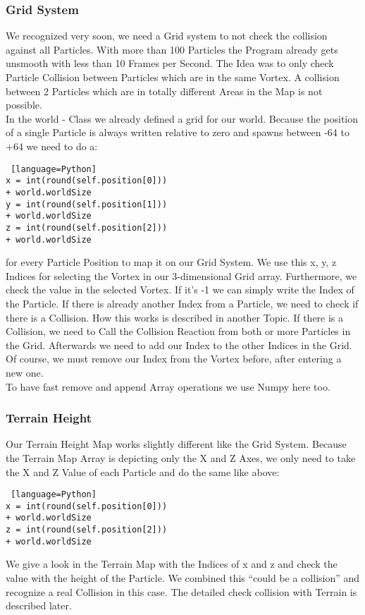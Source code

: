 \documentclass{sig-alternate-05-2015}
\begin{document}
\subsubsection{Grid System}
We recognized very soon, we need a Grid system to not check the collision against all Particles. With more than 100 Particles the Program already gets unsmooth with less than 10 Frames per Second. The Idea was to only check Particle Collision between Particles which are in the same Vortex. A collision between 2 Particles which are in totally different Areas in the Map is not possible.\\
In the world - Class we already defined a grid for our world. Because the position of a single Particle is always written relative to zero and spawns between -64 to +64 we need to do a: \\
\begin{lstlisting} [language=Python]
x = int(round(self.position[0])) 
+ world.worldSize
y = int(round(self.position[1]))
+ world.worldSize
z = int(round(self.position[2]))
+ world.worldSize
\end{lstlisting}
for every Particle Position to map it on our Grid System. We use this x, y, z Indices for selecting the Vortex in our 3-dimensional Grid array. Furthermore, we check the value in the selected Vortex. If it’s -1 we can simply write the Index of the Particle. If there is already another Index from a Particle, we need to check if there is a Collision. How this works is described in another Topic. If there is a Collision, we need to Call the Collision Reaction from both or more Particles in the Grid. Afterwards we need to add our Index to the other Indices in the Grid. Of course, we must remove our Index from the Vortex before, after entering a new one. \\
To have fast remove and append Array operations we use Numpy here too. \\
\subsubsection{Terrain Height}
Our Terrain Height Map works slightly different like the Grid System. Because the Terrain Map Array is depicting only the X and Z Axes, we only need to take the X and Z Value of each Particle and do the same like above: \\
\begin{lstlisting} [language=Python]
x = int(round(self.position[0]))
+ world.worldSize
z = int(round(self.position[2]))
+ world.worldSize
\end{lstlisting}
We give a look in the Terrain Map with the Indices of x and z and check the value with the height of the Particle. We combined this “could be a collision” and recognize a real Collision in this case. The detailed check collision with Terrain is described later. \\
\end{document}
